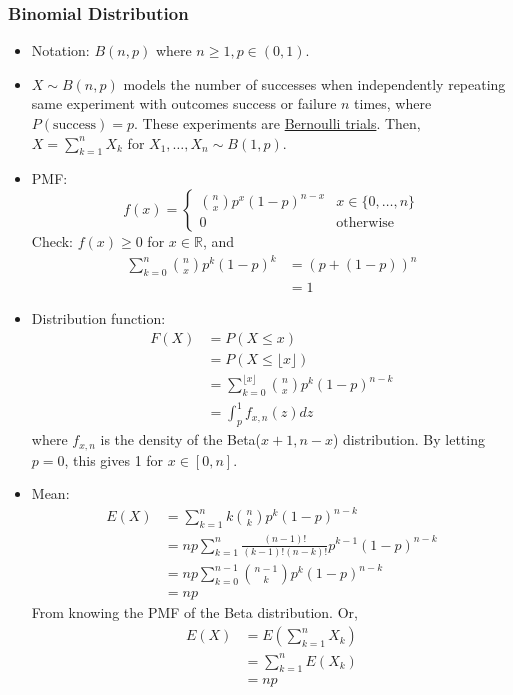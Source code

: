 \documentclass{article}
\newcommand{\R}{\mathbb{R}}
\begin{document}
		\subsubsection{Binomial Distribution}
		\begin{itemize}
			\item Notation: $B(n, p)$ where $n\geq1, p\in(0, 1)$.
			\item $X\sim B(n, p)$ models the number of successes when independently repeating same experiment with outcomes success or failure $n$ times, where $P(\mbox{success})=p$. These experiments are \ul{Bernoulli trials}. Then, $X=\sum_{k=1}^{n}X_k$ for $X_1, \dots, X_n\sim B(1, p)$.
			\item PMF: \[f(x)=
						\begin{cases}
							\binom{n}{x}p^x(1-p)^{n-x}&x\in\{0, \dots, n\}\\
							0&\mbox{otherwise}
						\end{cases}\]
			Check: $f(x)\geq0$ for $x\in\R$, and
			\begin{align*}
				\sum_{k=0}^{n}\binom{n}{x}p^k(1-p)^{k}&=(p+(1-p))^n\\
				&=1
			\end{align*}
			\item Distribution function:
			\begin{align*}
				F(X)&=P(X\leq x)\\
				&=P(X\leq\lfloor x\rfloor)\\
				&=\sum_{k=0}^{\lfloor x\rfloor}\binom{n}{x}p^k(1-p)^{n-k}\\
				&=\int_{p}^{1}f_{x, n}(z)dz
			\end{align*}
			where $f_{x, n}$ is the density of the Beta($x+1, n-x$) distribution. By letting $p=0$, this gives 1 for $x\in[0, n]$.
			\item Mean:
			\begin{align*}
				E(X)&=\sum_{k=1}^{n}k\binom{n}{k}p^k(1-p)^{n-k}\\
				&=np\sum_{k=1}^{n}\frac{(n-1)!}{(k-1)!(n-k)!}p^{k-1}(1-p)^{n-k}\\
				&=np\sum_{k=0}^{n-1}\binom{n-1}{k}p^k(1-p)^{n-k}\\
				&=np
			\end{align*}
			From knowing the PMF of the Beta distribution. Or,
			\begin{align*}
				E(X)&=E(\sum_{k=1}^{n}X_k)\\
				&=\sum_{k=1}^{n}E(X_k)\\
				&=np
			\end{align*}

\end{itemize}
\end{document}
